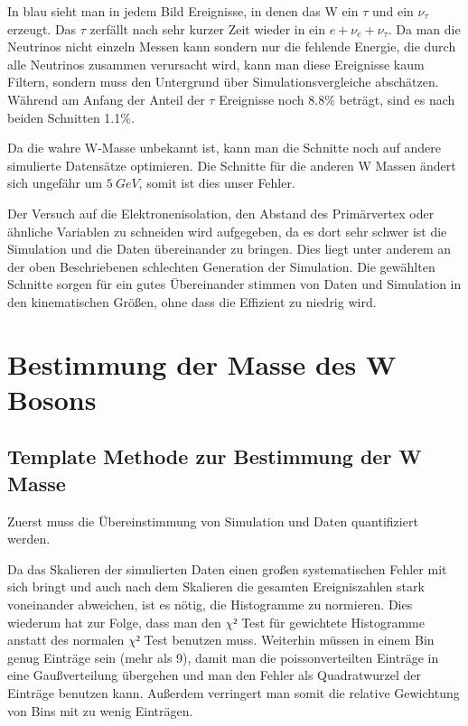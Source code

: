 \documentclass[a4paper,12pt]{article}
\begin{document}
In blau sieht man in jedem Bild Ereignisse, in denen das W ein $τ$ und ein $ν_τ$ erzeugt. Das $τ$
zerfällt nach sehr kurzer Zeit wieder in ein $e + ν_e + ν_τ$. Da man die Neutrinos nicht einzeln
Messen kann sondern nur die fehlende Energie, die durch alle Neutrinos zusammen verursacht wird,
kann man diese Ereignisse kaum Filtern, sondern muss den Untergrund über Simulationsvergleiche
abschätzen. Während am Anfang der Anteil der $τ$ Ereignisse noch 8.8\% beträgt, sind es nach beiden
Schnitten 1.1\%.

Da die wahre W-Masse unbekannt ist, kann man die Schnitte noch auf andere simulierte Datensätze
optimieren. Die Schnitte für die anderen W Massen ändert sich ungefähr um $\SI{5}{GeV}$, somit ist
dies unser Fehler.

Der Versuch auf die Elektronenisolation, den Abstand des Primärvertex oder ähnliche Variablen zu
schneiden wird aufgegeben, da es dort sehr schwer ist die Simulation und die Daten übereinander zu
bringen. Dies liegt unter anderem an der oben Beschriebenen schlechten Generation der Simulation.
Die gewählten Schnitte sorgen für ein gutes Übereinander stimmen von Daten und Simulation in den
kinematischen Größen, ohne dass die Effizient zu niedrig wird.

\newpage
\section{Bestimmung der Masse des W Bosons}
\subsection{Template Methode zur Bestimmung der W Masse}\label{cap:template}
Zuerst muss die Übereinstimmung von Simulation und Daten quantifiziert werden.

Da das Skalieren der simulierten Daten einen großen systematischen Fehler mit sich bringt und auch nach dem
Skalieren die gesamten Ereigniszahlen stark voneinander abweichen, ist es nötig, die Histogramme zu
normieren. Dies wiederum hat zur Folge, dass man den $χ²$ Test für gewichtete Histogramme anstatt
des normalen $χ²$ Test benutzen
muss\cite{cramer1999mathematical}.
Weiterhin müssen in einem Bin genug
Einträge sein (mehr als 9), damit man die poissonverteilten Einträge in eine Gaußverteilung 
übergehen und man den Fehler als Quadratwurzel der Einträge benutzen kann. Außerdem verringert man
somit die relative Gewichtung von Bins mit zu wenig Einträgen.
\end{document}
